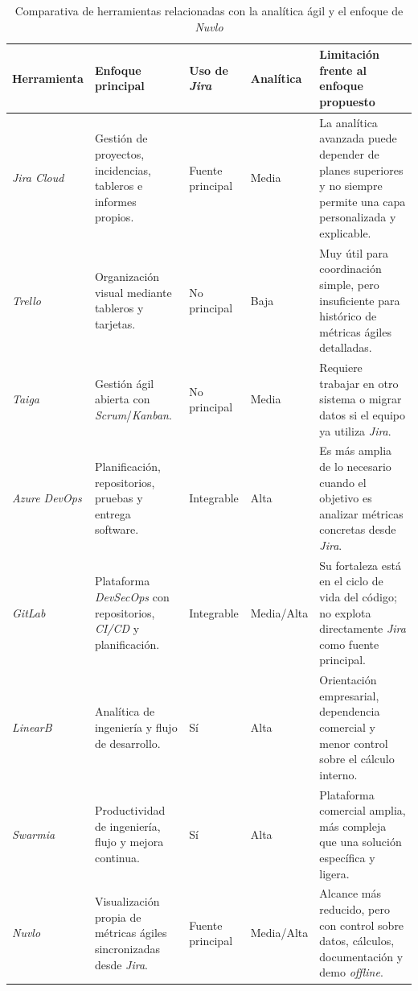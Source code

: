 \begin{landscape}
\begin{table}[p]
\centering
\scriptsize
\setlength{\tabcolsep}{5pt}
\renewcommand{\arraystretch}{1.12}
\begin{tabularx}{\linewidth}{p{2.7cm}p{4.3cm}p{2.5cm}p{2.5cm}X}
\toprule
\textbf{Herramienta} & \textbf{Enfoque principal} & \textbf{Uso de \textit{Jira}} & \textbf{Analítica} & \textbf{Limitación frente al enfoque propuesto} \\
\midrule
\textit{Jira Cloud} & Gestión de proyectos, incidencias, tableros e informes propios. & Fuente principal & Media & La analítica avanzada puede depender de planes superiores y no siempre permite una capa personalizada y explicable. \\
\textit{Trello} & Organización visual mediante tableros y tarjetas. & No principal & Baja & Muy útil para coordinación simple, pero insuficiente para histórico de métricas ágiles detalladas. \\
\textit{Taiga} & Gestión ágil abierta con \textit{Scrum}/\textit{Kanban}. & No principal & Media & Requiere trabajar en otro sistema o migrar datos si el equipo ya utiliza \textit{Jira}. \\
\textit{Azure DevOps} & Planificación, repositorios, pruebas y entrega software. & Integrable & Alta & Es más amplia de lo necesario cuando el objetivo es analizar métricas concretas desde \textit{Jira}. \\
\textit{GitLab} & Plataforma \textit{DevSecOps} con repositorios, \textit{CI/CD} y planificación. & Integrable & Media/Alta & Su fortaleza está en el ciclo de vida del código; no explota directamente \textit{Jira} como fuente principal. \\
\textit{LinearB} & Analítica de ingeniería y flujo de desarrollo. & Sí & Alta & Orientación empresarial, dependencia comercial y menor control sobre el cálculo interno. \\
\textit{Swarmia} & Productividad de ingeniería, flujo y mejora continua. & Sí & Alta & Plataforma comercial amplia, más compleja que una solución específica y ligera. \\
\textit{Nuvlo} & Visualización propia de métricas ágiles sincronizadas desde \textit{Jira}. & Fuente principal & Media/Alta & Alcance más reducido, pero con control sobre datos, cálculos, documentación y demo \textit{offline}. \\
\bottomrule
\end{tabularx}
\caption{Comparativa de herramientas relacionadas con la analítica ágil y el enfoque de \textit{Nuvlo}}
\label{tab:comparativa-antecedentes}
\end{table}
\end{landscape}

